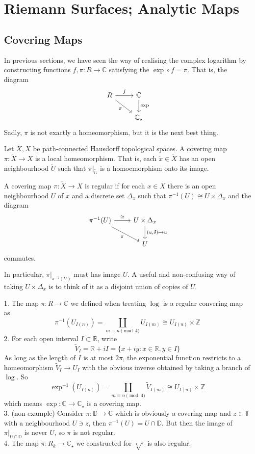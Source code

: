 \section{Riemann Surfaces; Analytic Maps}
\subsection{Covering Maps}
In previous sections, we have seen the way of realising the complex logarithm by constructing functions $f,\pi:R\to\mathbb C$ satisfying the $\exp\circ f=\pi$.
That is, the diagram
\[
    \begin{tikzcd}
        R\arrow{r}{f}\arrow[swap]{dr}{\pi}&\mathbb C\arrow{d}{\exp}\\
        &\mathbb C_\star
    \end{tikzcd}
\]
Sadly, $\pi$ is not exactly a homeomorphism, but it is the next best thing.
\begin{definition}
    Let $\tilde{X},X$ be path-connected Hausdorff topological spaces.
    A covering map $\pi:\tilde{X}\to X$ is a local homeomorphism.
    That is, each $\tilde{x}\in\tilde{X}$ has an open neighbourhood $\tilde{U}$ such that $\pi|_{\tilde{U}}$ is a homoemorphism onto its image.
\end{definition}
\begin{definition}
    A covering map $\pi:\tilde{X}\to X$ is regular if for each $x\in X$ there is an open neighbourhood $U$ of $x$ and a discrete set $\Delta_x$ such that $\pi^{-1}(U)\cong U\times\Delta_x$ and the diagram
    \[
        \begin{tikzcd}
            \pi^{-1}(U)\arrow{r}{\cong}\arrow[swap]{dr}{\pi}&U\times\Delta_x\arrow{d}{(u,\delta)\mapsto u}\\
            &U
        \end{tikzcd}
    \]
    commutes.
\end{definition}
In particular, $\pi|_{\pi^{-1}(U)}$ must has image $U$.
A useful and non-confusing way of taking $U\times\Delta_x$ is to think of it as a disjoint union of copies of $U$.
\begin{example}
    1. The map $\pi:R\to\mathbb C$ we defined when treating $\log$ is a regular convering map as
    $$\pi^{-1}(U_{I(n)})=\coprod_{m\equiv n\pmod{4}}U_{I(m)}\cong U_{I(n)}\times\mathbb Z$$
    2. For each open interval $I\subset\mathbb R$, write
    $$\tilde{V}_I=\mathbb R+iI=\{x+iy:x\in\mathbb R,y\in I\}$$
    As long as the length of $I$ is at most $2\pi$, the exponential function restricts to a homeomorphism $\tilde{V}_I\to U_I$ with the obvious inverse obtained by taking a branch of $\log$.
    So
    $$\exp^{-1}(U_{I(n)})=\coprod_{m\equiv n\pmod{4}}\tilde{V}_{I(m)}\cong U_{I(n)}\times\mathbb Z$$
    which means $\exp:\mathbb C\to\mathbb C_\star$ is a covering map.\\
    3. (non-example) Consider $\pi:\mathbb D\to\mathbb C$ which is obviously a covering map and $z\in\mathbb T$ with a neighbourhood $U\ni z$, then $\pi^{-1}(U)=U\cap\mathbb D$.
    But then the image of $\pi|_{U\cap\mathbb D}$ is never $U$, so $\pi$ is not regular.\\
    4. The map $\pi:R_k\to\mathbb C_\star$ we constructed for $\sqrt[k]{\cdot}$ is also regular.
\end{example}